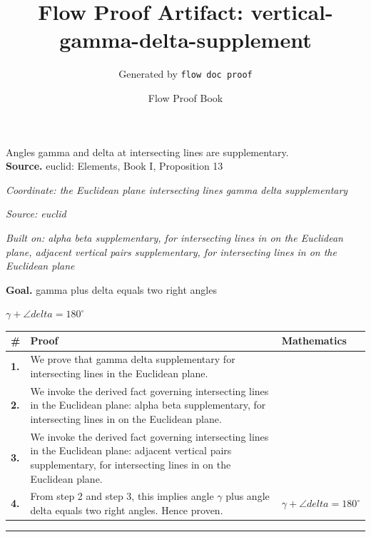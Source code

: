 \documentclass[11pt]{article}
\title{Flow Proof Artifact: vertical-gamma-delta-supplement}
\author{Generated by \texttt{flow doc proof}}
\date{Flow Proof Book}
\theoremstyle{definition}
\begin{document}
\maketitle
Angles gamma and delta at intersecting lines are supplementary.\\[0.5em]
\textbf{Source.} euclid: Elements, Book I, Proposition 13\\[0.5em]
\bigskip
{}\par
\smallskip\noindent\textit{Coordinate: the Euclidean plane \cdot intersecting lines \cdot gamma delta supplementary}\par
\smallskip\noindent\textit{Source: euclid}\par
\smallskip\noindent\textit{Built on: alpha beta supplementary, for intersecting lines in on the Euclidean plane, adjacent vertical pairs supplementary, for intersecting lines in on the Euclidean plane}\par
\medskip
\noindent\textbf{Goal.} gamma plus delta equals two right angles\par
\noindent$\displaystyle \gamma + \angle delta = 180^\circ$\par
\medskip
\noindent
\begin{tabular}{@{} >{\raggedright\arraybackslash}p{} >{\raggedright\arraybackslash}p{} >{\raggedleft\arraybackslash}p{} @{}}
\textbf{\#} & \textbf{Proof} & \textbf{Mathematics} \\
\midrule
\textbf{1.} & We prove that gamma delta supplementary for intersecting lines in the Euclidean plane. & \\[0.45em]
\textbf{2.} & We invoke the derived fact governing intersecting lines in the Euclidean plane: alpha beta supplementary, for intersecting lines in on the Euclidean plane. & \\[0.45em]
\textbf{3.} & We invoke the derived fact governing intersecting lines in the Euclidean plane: adjacent vertical pairs supplementary, for intersecting lines in on the Euclidean plane. & \\[0.45em]
\textbf{4.} & From step 2 and step 3, this implies angle $\gamma$ plus angle delta equals two right angles. Hence proven. & $\displaystyle \gamma + \angle delta = 180^\circ$ \\[0.45em]
\bottomrule
\end{tabular}
\label{thm:Geometry-intersecting lines-gamma_delta_supplementary}
\par\medskip\hrule
\end{document}
